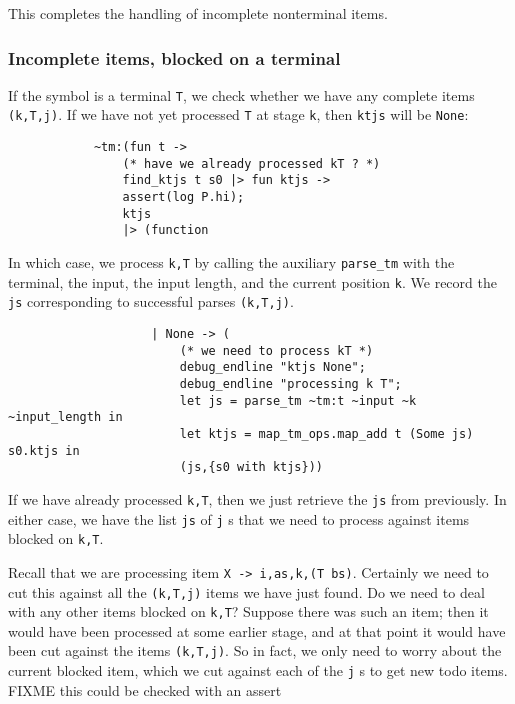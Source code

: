 \documentclass[]{article}
\begin{document}
\begin{multicols}{2}
This completes the handling of incomplete nonterminal items.

\subsubsection{Incomplete items, blocked on a terminal}

If the symbol is a terminal \texttt{T}, we check whether we have any
complete items \texttt{(k,T,j)}. If we have not yet processed \texttt{T}
at stage \texttt{k}, then \texttt{ktjs} will be \texttt{None}:

\begin{verbatim}
            ~tm:(fun t ->
                (* have we already processed kT ? *)
                find_ktjs t s0 |> fun ktjs ->
                assert(log P.hi);
                ktjs 
                |> (function 
\end{verbatim}

In which case, we process \texttt{k,T} by calling the auxiliary
\texttt{parse\_tm} with the terminal, the input, the input length, and
the current position \texttt{k}. We record the \texttt{js} corresponding
to successful parses \texttt{(k,T,j)}.

\begin{verbatim}
                    | None -> (
                        (* we need to process kT *)
                        debug_endline "ktjs None";
                        debug_endline "processing k T";
                        let js = parse_tm ~tm:t ~input ~k ~input_length in
                        let ktjs = map_tm_ops.map_add t (Some js) s0.ktjs in
                        (js,{s0 with ktjs}))
\end{verbatim}

If we have already processed \texttt{k,T}, then we just retrieve the
\texttt{js} from previously. In either case, we have the list
\texttt{js} of \texttt{j} s that we need to process against items
blocked on \texttt{k,T}.

Recall that we are processing item
\texttt{X -\textgreater{} i,as,k,(T bs\textquotesingle{})}. Certainly we
need to cut this against all the \texttt{(k,T,j)} items we have just
found. Do we need to deal with any other items blocked on \texttt{k,T}?
Suppose there was such an item; then it would have been processed at
some earlier stage, and at that point it would have been cut against the
items \texttt{(k,T,j)}. So in fact, we only need to worry about the
current blocked item, which we cut against each of the \texttt{j} s to
get new todo items. FIXME this could be checked with an assert


\end{multicols}
\end{document}
